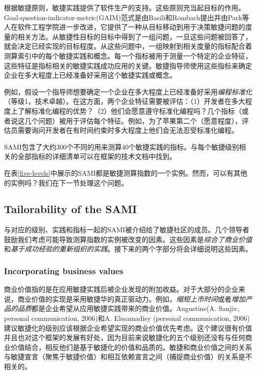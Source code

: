 \documentclass[twocolumn]{svjour3}[]
\begin{document}
根据敏捷原则，敏捷实践提供了软件生产的支持。这些原则充当起目标的作用。Goal-question-indicator-metric(GAIM)范式是由Basili和Rombach提出\cite{basili1992software}并由Park等人\cite{park1996goal}在软件工程学院进一步改进，它提供了一种从目标移动到用于决策敏捷问题的度量的相关方法。从敏捷性目标的目标中得到了一组问题，一旦这些问题被回答了，就会决定已经实现的目标程度。从这些问题中，一组映射到相关度量的指标配合着测算索引中的每个敏捷实践和概念。每一个指标被用于测量一个特定的企业特征，这些特征是指标相关的敏捷实践成功应用的关键。敏捷指导师使用这些指标来确定企业在多大程度上已经准备好采用这个敏捷实践或概念。

例如，假设一个指导师想要确定一个企业在多大程度上已经准备好采用\textit{编程标准化}（等级1，技术卓越）。在这方面，两个企业特征需要被评估：（1）开发者在多大程度上了解标准化编程的优势？（2）他们会愿意遵守标准化编程吗？几个指标（或者说这几个问题）被用于评估每个特征。例如，为了苹果第二个（愿意程度），评估员需要询问开发者在有时间约束时多大程度上他们会无法忍受标准化编程。

SAMI包含了大约300个不同的用来测算40个敏捷实践的指标。与每个敏捷级别相关的全部指标的详细清单可以在框架的技术文档中找到\cite{sidky2006agile}。

在表\ref{five-levels}中展示的SAMI都是敏捷测算指数的一个实例。然而，可以有其他的实例吗？我们在下一节处理这个问题。

\subsection{Tailorability of the SAMI}
\label{section2.5}

与对应的级别、实践和指标一起的SAMI被介绍给了敏捷社区的成员。几个领导者鼓励我们考虑可能导致测算指数的实例被改变的因素。这些因素是\textit{综合了商业价值}和\textit{基于成功经验的重新组织的实践}。接下来的两个字部分将会详细说明这些因素。

\subsubsection{Incorporating business values}

商业价值指的是在应用敏捷实践后被企业发现的附加收益。对于大部分的企业来说，商业价值的实现是采用敏捷华的真正驱动力。例如，\textit{缩短上市时间}或者\textit{增加产品的品质}都是企业希望从应用敏捷实践带来的商业价值。Augustine(A. Sanjiv, personal communication, 2006)和A. Elssamadisy (personal communication, 2006)建议敏捷化的级别应该根据企业希望实现的商业价值优先考虑。这个建议很有价值并且也对这个框架的发展有好处，因为目前来说敏捷化的五个级别还没有与任何商业价值结合，相反他们是基于敏捷化的价值和品质的。敏捷和商业价值之间的关系与敏捷宣言（聚焦于敏捷价值）和相互依赖宣言之间（捕捉商业价值）的关系是不相关的\cite{declaration2005pmdoim,agilemanifestoo2001agile}。
\end{document}
